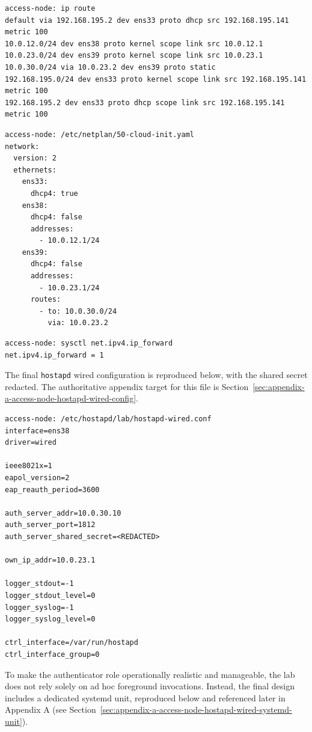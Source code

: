 \documentclass[11pt]{article}
\begin{document}
\begin{verbatim}
access-node: ip route
default via 192.168.195.2 dev ens33 proto dhcp src 192.168.195.141 metric 100
10.0.12.0/24 dev ens38 proto kernel scope link src 10.0.12.1
10.0.23.0/24 dev ens39 proto kernel scope link src 10.0.23.1
10.0.30.0/24 via 10.0.23.2 dev ens39 proto static
192.168.195.0/24 dev ens33 proto kernel scope link src 192.168.195.141 metric 100
192.168.195.2 dev ens33 proto dhcp scope link src 192.168.195.141 metric 100
\end{verbatim}

\begin{verbatim}
access-node: /etc/netplan/50-cloud-init.yaml
network:
  version: 2
  ethernets:
    ens33:
      dhcp4: true
    ens38:
      dhcp4: false
      addresses:
        - 10.0.12.1/24
    ens39:
      dhcp4: false
      addresses:
        - 10.0.23.1/24
      routes:
        - to: 10.0.30.0/24
          via: 10.0.23.2
\end{verbatim}

\begin{verbatim}
access-node: sysctl net.ipv4.ip_forward
net.ipv4.ip_forward = 1
\end{verbatim}

The final \texttt{hostapd} wired configuration is reproduced below, with the shared secret redacted. The authoritative appendix target for this file is Section~\ref{sec:appendix-a-access-node-hostapd-wired-config}.

\begin{verbatim}
access-node: /etc/hostapd/lab/hostapd-wired.conf
interface=ens38
driver=wired

ieee8021x=1
eapol_version=2
eap_reauth_period=3600

auth_server_addr=10.0.30.10
auth_server_port=1812
auth_server_shared_secret=<REDACTED>

own_ip_addr=10.0.23.1

logger_stdout=-1
logger_stdout_level=0
logger_syslog=-1
logger_syslog_level=0

ctrl_interface=/var/run/hostapd
ctrl_interface_group=0
\end{verbatim}

To make the authenticator role operationally realistic and manageable, the lab does not rely solely on ad hoc foreground invocations. Instead, the final design includes a dedicated systemd unit, reproduced below and referenced later in Appendix A (see Section~\ref{sec:appendix-a-access-node-hostapd-wired-systemd-unit}).
\end{document}
